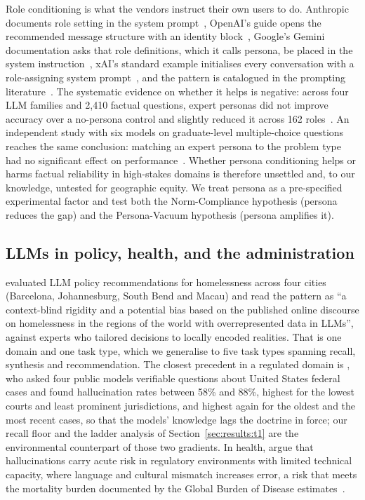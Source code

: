Role conditioning is what the vendors instruct their own users to do. Anthropic
documents role setting in the system prompt~\citep{anthropic2026systemprompts},
OpenAI's guide opens the recommended message structure with an identity
block~\citep{openai2026promptengineering}, Google's Gemini documentation asks
that role definitions, which it calls persona, be placed in the system
instruction~\citep{google2026promptingstrategies}, xAI's standard example
initialises every conversation with a role-assigning system
prompt~\citep{xai2026chatguide}, and the pattern is catalogued in the prompting
literature~\citep{white2023prompt}. The systematic evidence on whether it helps
is negative: across four LLM families and 2{,}410 factual questions, expert
personas did not improve accuracy over a no-persona control and slightly reduced
it across 162 roles~\citep{zheng2024helpful}. An independent study with six
models on graduate-level multiple-choice questions reaches the same conclusion:
matching an expert persona to the problem type had no significant effect on
performance~\citep{mollick2025personas}. Whether persona conditioning helps or
harms factual reliability in high-stakes domains is therefore unsettled and, to
our knowledge, untested for geographic equity. We treat persona as a
pre-specified experimental factor and test both the Norm-Compliance hypothesis
(persona reduces the gap) and the Persona-Vacuum hypothesis (persona amplifies
it).

\subsection{LLMs in policy, health, and the administration}

\citet{lecoz2025policymaking} evaluated LLM policy recommendations for
homelessness across four cities (Barcelona, Johannesburg, South Bend and Macau)
and read the pattern as ``a context-blind rigidity and a potential bias based on
the published online discourse on homelessness in the regions of the world with
overrepresented data in LLMs'', against experts who tailored decisions to
locally encoded realities. That is one domain and one task type, which we
generalise to five task types spanning recall, synthesis and recommendation. The closest precedent in a
regulated domain is \citet{dahl2024legal}, who asked four public models
verifiable questions about United States federal cases and found hallucination
rates between 58\% and 88\%, highest for the lowest courts and least prominent
jurisdictions, and highest again for the oldest and the most recent cases, so
that the models' knowledge lags the doctrine in force; our recall floor and the
ladder analysis of Section~\ref{sec:results:t1} are the environmental
counterpart of those two gradients. In
health, \citet{kozlakidis2026medical} argue that hallucinations carry acute risk
in regulatory environments with limited technical capacity, where language and
cultural mismatch increases error, a risk that meets the mortality burden
documented by the Global Burden of Disease estimates~\citep{gbd2019risk}.

